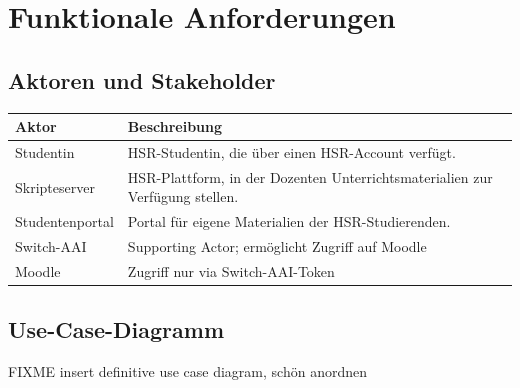 \documentclass[a4paper]{article}
\let\oldsection\section
\renewcommand\section{\clearpage\oldsection}
\begin{document}
\begin{landscape}
\end{landscape}

\pagebreak
\section{Funktionale Anforderungen}

\subsection{Aktoren und Stakeholder}

\begin{tabulary}{\linewidth}{lL}
	\toprule
	Aktor & Beschreibung\\
	\midrule
	Studentin & HSR-Studentin, die über einen HSR-Account verfügt.\\
	Skripteserver & HSR-Plattform, in der Dozenten Unterrichtsmaterialien zur Verfügung stellen.\\
	Studentenportal & Portal für eigene Materialien der HSR-Studierenden.\\
	Switch-AAI & Supporting Actor; ermöglicht Zugriff auf Moodle \\	
	Moodle & Zugriff nur via Switch-AAI-Token\\
	
	\bottomrule
\end{tabulary}

\subsection{Use-Case-Diagramm}

FIXME insert definitive use case diagram, schön anordnen
\end{document}
